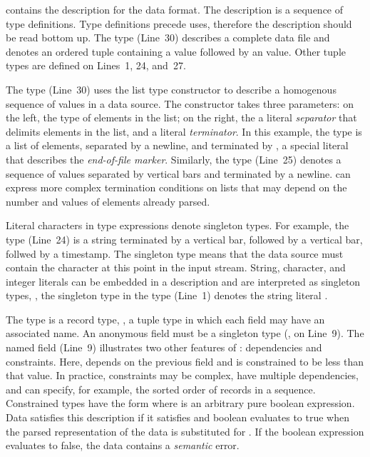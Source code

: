  contains the \padsml{} description for the
\dibbler{} data format.  The description is a sequence of type
definitions.  Type definitions precede uses, therefore the description
should be read bottom up.
The type  (Line~30) describes a complete \dibbler{} data
file and denotes an ordered tuple containing a
 value followed by an  value.
Other tuple types are defined on Lines~1, 24, and~27.

The type  (Line~30) uses the list type constructor
 to describe a homogenous sequence of values in a data
source.  The  constructor takes three parameters: on the
left, the type of elements in the list; on the right, the a literal
\emph{separator} that delimits elements in the list, and a literal
\emph{terminator}.  In this example, the type  is a list of
 elements, separated by a newline, and terminated by
, a special literal that describes the \emph{end-of-file
  marker}.  Similarly, the  type (Line~25) denotes a
sequence of  values separated by vertical bars and
terminated by a newline.  \padsml{} can express more
complex termination conditions on lists that may depend on the number
and values of elements already parsed.

Literal characters in type expressions denote singleton types.  For
example, the  type (Line~24) is a string terminated by a
vertical bar, followed by a vertical bar, follwed by a timestamp.  The
singleton type  means that the data source must contain the
character  at this point in the input stream.  String,
character, and integer literals can be embedded in a description and
are interpreted as singleton types, \eg{}, the singleton type
 in the  type (Line~1) 
denotes the string literal .

The type  is a record type, \ie{}, a tuple type in
which each field may have an associated name.  An anonymous field must
be a singleton type (\eg{},  on Line~9).  The named field
 (Line~9) illustrates two other features of
\padsml: dependencies and constraints.  Here, 
depends on the previous field  and is constrained to be
less than that value.  In practice, constraints may be complex, have
multiple dependencies, and can specify, for example, the sorted order
of records in a sequence.  Constrained types have the form \cd{[x:T |
e]} where  is an arbitrary pure boolean expression.  Data
satisfies this description if it satisfies  and boolean 
evaluates to true when the parsed representation of the data is
substituted for .  If the boolean expression evaluates to false,
the data contains a \textit{semantic} error.

